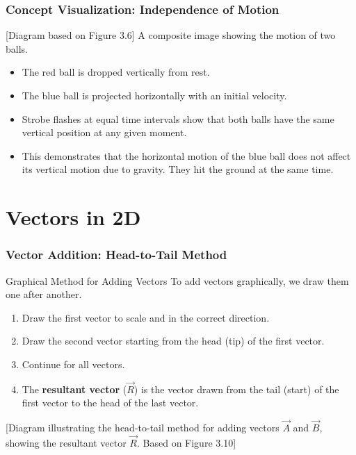 \documentclass{beamer}
\begin{document}
\begin{frame}
\frametitle{Concept Visualization: Independence of Motion}
\begin{alertblock}{[Diagram based on Figure 3.6]}
A composite image showing the motion of two balls.
\begin{itemize}
    \item The red ball is dropped vertically from rest.
    \item The blue ball is projected horizontally with an initial velocity.
    \item Strobe flashes at equal time intervals show that both balls have the same vertical position at any given moment.
    \item This demonstrates that the horizontal motion of the blue ball does not affect its vertical motion due to gravity. They hit the ground at the same time.
\end{itemize}
\end{alertblock}
\end{frame}

\section{Vectors in 2D}

\begin{frame}
\frametitle{Vector Addition: Head-to-Tail Method}
\begin{block}{Graphical Method for Adding Vectors}
To add vectors graphically, we draw them one after another.
\end{block}
\begin{enumerate}
    \item Draw the first vector to scale and in the correct direction.
    \item Draw the second vector starting from the head (tip) of the first vector.
    \item Continue for all vectors.
    \item The \textbf{resultant vector} ($\vec{R}$) is the vector drawn from the tail (start) of the first vector to the head of the last vector.
\end{enumerate}
\vfill
\begin{alertblock}{[Diagram illustrating the head-to-tail method for adding vectors $\vec{A}$ and $\vec{B}$, showing the resultant vector $\vec{R}$. Based on Figure 3.10]}
\end{alertblock}
\end{frame}
\end{document}
